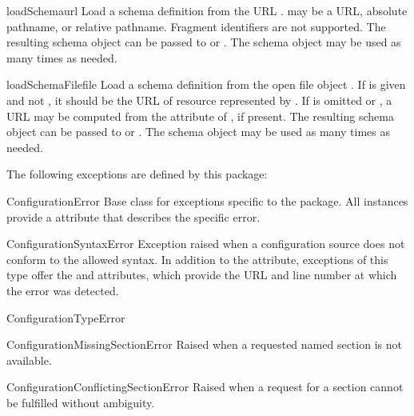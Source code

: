 \documentclass{howto}
\begin{document}
\begin{funcdesc}{loadSchema}{url}
  Load a schema definition from the URL .
   may be a URL, absolute pathname, or relative pathname.
  Fragment identifiers are not supported.
  The resulting
  schema object can be passed to  or
  .  The schema object may be used as many
  times as needed.
\end{funcdesc}

\begin{funcdesc}{loadSchemaFile}{file}
  Load a schema definition from the open file object .  If
   is given and not , it should be the URL of
  resource represented by .  If  is omitted or
  , a URL may be computed from the  attribute
  of , if present.  The resulting schema object can
  be passed to  or .
  The schema object may be used as many times as needed.
\end{funcdesc}

The following exceptions are defined by this package:

\begin{excdesc}{ConfigurationError}
  Base class for exceptions specific to the  package.
  All instances provide a  attribute that describes
  the specific error.
\end{excdesc}

\begin{excdesc}{ConfigurationSyntaxError}
  Exception raised when a configuration source does not conform to the
  allowed syntax.  In addition to the  attribute,
  exceptions of this type offer the  and 
  attributes, which provide the URL and line number at which the error
  was detected.
\end{excdesc}

\begin{excdesc}{ConfigurationTypeError}
\end{excdesc}

\begin{excdesc}{ConfigurationMissingSectionError}
  Raised when a requested named section is not available.
\end{excdesc}

\begin{excdesc}{ConfigurationConflictingSectionError}
  Raised when a request for a section cannot be fulfilled without
  ambiguity.
\end{excdesc}
\end{document}
